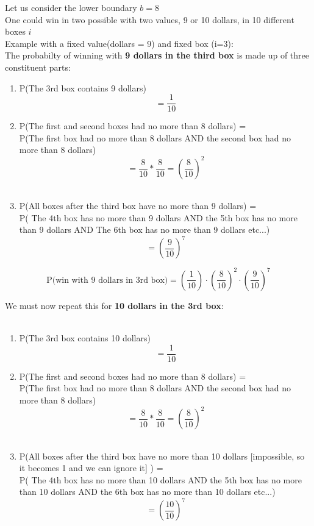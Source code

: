 \documentclass{report}
\begin{document}
Let us consider the lower boundary $b = 8$\\

One could win in two possible with two values, 9 or 10 dollars, in 10 different boxes $i$ \\
Example with a fixed value(dollars = 9) and fixed box (i=3):\\
The probabilty of winning with \textbf{9 dollars in the third box} is made up of three constituent parts:\\

\begin{enumerate}

\item P(The 3rd box contains 9 dollars) \\ \[ = \frac{1}{10}\]

\item P(The first and second boxes had no more than 8 dollars) = \\P(The first box had no more than 8 dollars AND the second box had no more than 8 dollars)\\

 \[= \frac{8}{10} * \frac{8}{10} = \left(\frac{8}{10}\right)^{2} \]
\\
\item P(All boxes after the third box have no more than 9 dollars) = \\
P( The 4th box has no more than 9 dollars AND the 5th box has no more than 9 dollars AND The 6th box has no more than 9 dollars etc...)
 \[= \left(\frac{9}{10}\right)^{7} \]

\end{enumerate}

\[
\textrm{P(win with 9 dollars in 3rd box)}=
\left( \frac{1}{10} \right)\cdot \left( \frac{8}{10} \right)^{2}\cdot \left(\frac{9}{10} \right)^{7}
\]

\pagebreak

We must now repeat this for \textbf{10 dollars in the 3rd box}:\\
\\
\begin{enumerate}
	
	\item P(The 3rd box contains 10 dollars) \\ \[ = \frac{1}{10}\]
	
	\item P(The first and second boxes had no more than 8 dollars) = \\P(The first box had no more than 8 dollars AND the second box had no more than 8 dollars)\\
	
	\[= \frac{8}{10} * \frac{8}{10} = \left(\frac{8}{10}\right)^{2} \]
	\\
	\item P(All boxes after the third box have no more than 10 dollars [impossible, so it becomes 1 and we can ignore it] ) = \\
	P( The 4th box has no more than 10 dollars AND the 5th box has no more than 10 dollars AND the 6th box has no more than 10 dollars etc...)
	\[= \left(\frac{10}{10}\right)^{7} \]
	
\end{enumerate}
\end{document}
